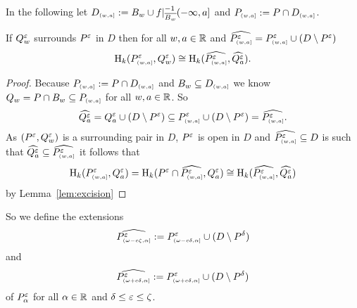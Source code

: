 

In the following let $D\subi{w,a} := B_w\cup f\rest_{\comp{B_w}}^{-1}(-\infty,a]$ and $P\subi{w,a} := P\cap D\subi{w,a}$.

\begin{lemma}\label{lem:extension_apply}
  If $Q_w^\e$ surrounds $P^\e$ in $D$ then for all $w,a\in\R$ and $\ext{P\subi{w,a}^\e} = P\subi{w,a}^\e \cup (D\setminus P^\e)$
  \[\hom_k(P\subi{w,a}^\e, Q_w^\e)\cong \hom_k(\ext{P\subi{w,a}^\e}, \ext{Q^\e_a}).\]
\end{lemma}
\begin{proof}
  Because $P\subi{w,a} := P\cap D\subi{w,a}$ and $B_w\subseteq D\subi{w,a}$ we know $Q_w = P\cap B_w \subseteq P\subi{w,a}$ for all $w,a\in\R$.
  So
  \[\ext{Q^\e_a} = Q^\e_a\cup (D\setminus P^\e) \subseteq P\subi{w,a}^\e \cup (D\setminus P^\e) = \ext{P\subi{w,a}^\e}.\]
  As $(P^\e, Q_w^\e)$ is a surrounding pair in $D$, $P^\e$ is open in $D$ and $\ext{P\subi{w,a}^\e}\subseteq D$ is such that $\ext{Q^\e_a}\subseteq \ext{P\subi{w,a}^\e}$ it follows that
  \[\hom_k(P\subi{w,a}^\e, Q^\e_a) = \hom_k(P^\e\cap \ext{P\subi{w,a}^\e}, Q^\e_a) \cong\hom_k(\ext{P\subi{w,a}^\e}, \ext{Q^\e_a})\]
  by Lemma~\ref{lem:excision}
\end{proof}

So we define the extensions
\[\ext{P^\e\subi{\omega-c\zeta, \alpha}} := P^\e\subi{\omega-c\delta, \alpha}\cup (D\setminus \P)\]
and
\[\ext{P^\e\subi{\omega+c\delta, \alpha}} := P^\e\subi{\omega+c\delta, \alpha}\cup (D\setminus \P)\]
of $P^\e_\alpha$ for all $\alpha\in\R$ and $\delta\leq\e\leq\zeta$.

